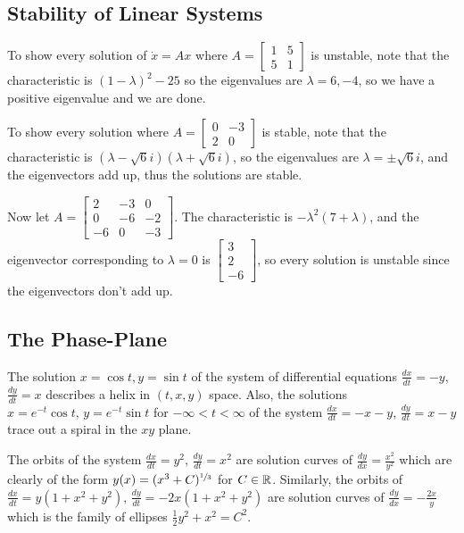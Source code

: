 \subsection{Stability of Linear Systems}
\begin{example}
    To show every solution of $\dot x=Ax$ where $A=
    \begin{bmatrix}
        1 & 5\\ 5&1
    \end{bmatrix}$ is unstable, note that the characteristic is $(1-\lambda)^2-25$ so the eigenvalues are $\lambda=6,-4$, so we have a positive eigenvalue and we are done.
\end{example}
\begin{example}
    To show every solution where $A=
    \begin{bmatrix}
0 & -3 \\ 2&0
    \end{bmatrix}$ is stable, note that the characteristic is $(\lambda -\sqrt{6} i)(\lambda +\sqrt{6} i)$, so the eigenvalues are $\lambda =\pm \sqrt{6} i$, and the eigenvectors add up, thus the solutions are stable.
\end{example}
\begin{example}
    Now let $A=
    \begin{bmatrix}
        2 & -3 & 0 \\ 0 & -6 & -2 \\ -6 & 0 & -3
    \end{bmatrix}$. The characteristic is $-\lambda^2(7+\lambda)$, and the eigenvector corresponding to $\lambda=0$ is $
    \begin{bmatrix}
        3 \\ 2 \\ -6
    \end{bmatrix}$, so every solution is unstable since the eigenvectors don't add up.
\end{example}

\subsection{The Phase-Plane}
\begin{example}
    The solution $x=\cos t, y=\sin t$ of the system of differential equations $\frac{dx}{dt}=-y$, $\frac{dy}{dt}=x$ describes a helix in $(t,x,y)$ space. Also, the solutions $x=e^{-t}\cos t,\, y=e^{-t}\sin t$ for $-\infty<t<\infty$ of the system $\frac{dx}{dt}=-x-y$, $\frac{dy}{dt}=x-y$ trace out a spiral in the $xy$ plane.
\end{example}
\begin{example}
    The orbits of the system $\frac{dx}{dt}=y^2,\,\frac{dy}{dt}=x^2$ are solution curves of $\frac{dy}{dx}=\frac{x^2}{y^2}$ which are clearly of the form $y(x)=(x^3+C)^{\sfrac{1}{3}}$ for $C\in \mathbb{R}$. Similarly, the orbits of $\frac{dx}{dt}=y(1+x^2+y^2),\, \frac{dy}{dt}=-2x(1+x^2+y^2)$ are solution curves of $\frac{dy}{dx}=-\frac{2x}{y}$ which is the family of ellipses $\frac{1}{2}y^2+x^2=C^2$.
\end{example}

